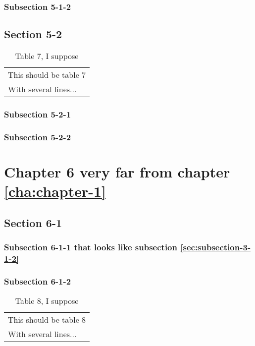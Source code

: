 \documentclass[10pt]{book}
\begin{document}
\subsection{Subsection 5-1-2}
\label{sec:subsection-5-1-2}

\section{Section 5-2}
\label{sec:section-5-2}


\begin{table}
  \centering
  \begin{tabular}{l}
    This should be table 7\\
    With several lines...
  \end{tabular}
  \caption{Table 7, I suppose}
  \label{tab:table-7}
\end{table}

\subsection{Subsection 5-2-1}
\label{sec:subsection-5-2-1}

\subsection{Subsection 5-2-2}
\label{sec:subsection-5-2-2}


\chapter{Chapter 6 very far from chapter \ref{cha:chapter-1}}
\label{cha:chapter-6}
\minitoc
\minilot
\minilof

\section{Section 6-1}
\label{sec:section-6-1}


\subsection{Subsection 6-1-1 that looks like subsection \ref{sec:subsection-3-1-2}}
\label{sec:subsection-6-1-1}

\subsection{Subsection 6-1-2}
\label{sec:subsection-6-1-2}

\begin{table}
  \centering
  \begin{tabular}{l}
    This should be table 8\\
    With several lines...
  \end{tabular}
  \caption{Table 8, I suppose}
  \label{tab:table-8}
\end{table}
\end{document}
